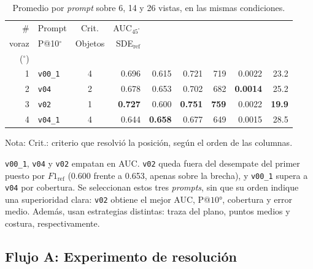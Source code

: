 \begin{table}[H]
\centering
\caption{Promedio por \textit{prompt} sobre 6, 14 y 26 vistas, en las mismas condiciones.}
\label{tab:plane_top_prompts}
\footnotesize
\setlength{\tabcolsep}{3pt}
\renewcommand{\arraystretch}{0.95}

\begin{tabular*}{\textwidth}{@{\extracolsep{\fill}}rlcrrrrrr@{}}
\toprule
\# & Prompt & Crit. & AUC$_{45^\circ}$ & \begin{tabular}[b]{@{}c@{}}$F1_{\mathrm{ref}}$ \\ voraz\end{tabular} & P@10$^\circ$ & Objetos & SDE$_{\mathrm{ref}}$ & \begin{tabular}[b]{@{}c@{}}Err.\ medio \\ ($^\circ$)\end{tabular} \\
\midrule
1 & \texttt{v00\_1} & 4 & 0.696 & 0.615 & 0.721 & 719 & 0.0022 & 23.2 \\
2 & \texttt{v04} & 2 & 0.678 & 0.653 & 0.702 & 682 & \textbf{0.0014} & 25.2 \\
3 & \texttt{v02} & 1 & \textbf{0.727} & 0.600 & \textbf{0.751} & \textbf{759} & 0.0022 & \textbf{19.9} \\
4 & \texttt{v04\_1} & 4 & 0.644 & \textbf{0.658} & 0.677 & 649 & 0.0015 & 28.5 \\
\bottomrule
\end{tabular*}

\vspace{0.5ex}
\begin{minipage}{\textwidth}
Nota: Crit.: criterio que resolvió la posición, según el orden de las columnas.
\end{minipage}
\end{table}

\texttt{v00\_1}, \texttt{v04} y \texttt{v02} empatan en AUC. \texttt{v02} queda fuera del desempate del primer puesto por $F1_{\text{ref}}$ (0.600 frente a 0.653, apenas sobre la brecha), y \texttt{v00\_1} supera a \texttt{v04} por cobertura. Se seleccionan estos tres \textit{prompts}, sin que su orden indique una superioridad clara: \texttt{v02} obtiene el mejor AUC, P@$10°$, cobertura y error medio. Además, usan estrategias distintas: traza del plano, puntos medios y costura, respectivamente.


\newpage
\subsection{Flujo A: Experimento de resolución}

